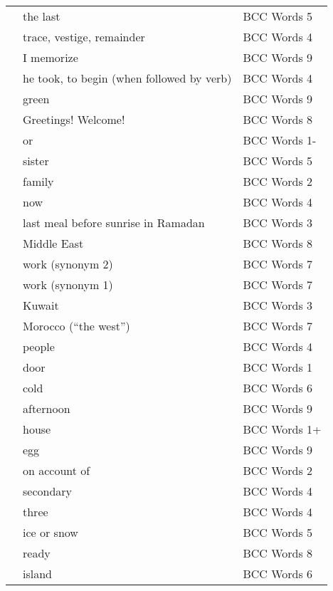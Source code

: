 \documentclass[10pt,twocolumn]{article}
\begin{document}
\begin{xtabular*}{\linewidth}{p{0.1\textwidth}p{0.2\textwidth}>{\footnotesize}p{0.2\textwidth}}
 & the last & BCC Words 5 \\
 & trace, vestige, remainder & BCC Words 4 \\
 & I memorize & BCC Words 9 \\
 & he took, to begin (when followed by verb) & BCC Words 4 \\
 & green & BCC Words 9 \\
 & Greetings! Welcome! & BCC Words 8 \\
 & or & BCC Words 1- \\
 & sister & BCC Words 5 \\
 & family & BCC Words 2 \\
 & now & BCC Words 4 \\
 & last meal before sunrise in Ramadan & BCC Words 3 \\
 & Middle East & BCC Words 8 \\
 & work (synonym 2) & BCC Words 7 \\
 & work (synonym 1) & BCC Words 7 \\
 & Kuwait & BCC Words 3 \\
 & Morocco (``the west'') & BCC Words 7 \\
 & people & BCC Words 4 \\
 & door & BCC Words 1 \\
 & cold & BCC Words 6 \\
 & afternoon & BCC Words 9 \\
 & house & BCC Words 1+ \\
 & egg & BCC Words 9 \\
 & on account of & BCC Words 2 \\
 & secondary & BCC Words 4 \\
 & three & BCC Words 4 \\
 & ice or snow & BCC Words 5 \\
 & ready & BCC Words 8 \\
 & island & BCC Words 6 \\

\end{xtabular*}
\end{document}
